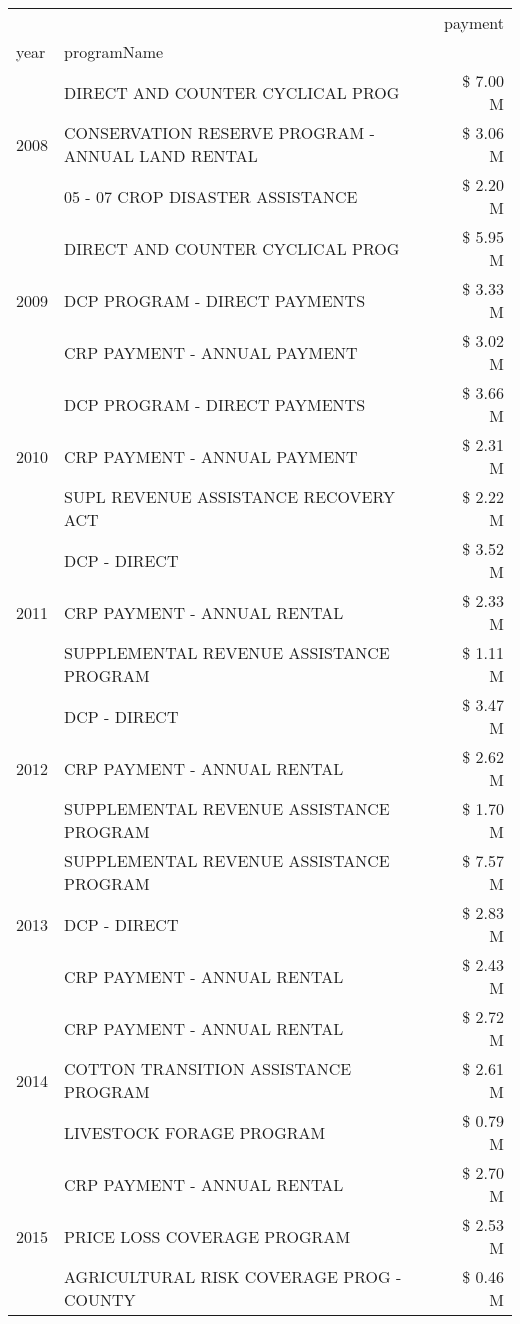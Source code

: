 \begin{tabular}{llr}
\toprule
 &  & payment \\
year & programName &  \\
\midrule
\multirow[t]{3}{*}{2008} & DIRECT AND COUNTER CYCLICAL PROG & \$ 7.00 M \\
 & CONSERVATION RESERVE PROGRAM - ANNUAL LAND RENTAL & \$ 3.06 M \\
 & 05 - 07 CROP DISASTER ASSISTANCE & \$ 2.20 M \\
\cline{1-3}
\multirow[t]{3}{*}{2009} & DIRECT AND COUNTER CYCLICAL PROG & \$ 5.95 M \\
 & DCP PROGRAM - DIRECT PAYMENTS & \$ 3.33 M \\
 & CRP PAYMENT - ANNUAL PAYMENT & \$ 3.02 M \\
\cline{1-3}
\multirow[t]{3}{*}{2010} & DCP PROGRAM - DIRECT PAYMENTS & \$ 3.66 M \\
 & CRP PAYMENT - ANNUAL PAYMENT & \$ 2.31 M \\
 & SUPL REVENUE ASSISTANCE RECOVERY ACT & \$ 2.22 M \\
\cline{1-3}
\multirow[t]{3}{*}{2011} & DCP - DIRECT & \$ 3.52 M \\
 & CRP PAYMENT - ANNUAL RENTAL & \$ 2.33 M \\
 & SUPPLEMENTAL REVENUE ASSISTANCE PROGRAM & \$ 1.11 M \\
\cline{1-3}
\multirow[t]{3}{*}{2012} & DCP - DIRECT & \$ 3.47 M \\
 & CRP PAYMENT - ANNUAL RENTAL & \$ 2.62 M \\
 & SUPPLEMENTAL REVENUE ASSISTANCE PROGRAM & \$ 1.70 M \\
\cline{1-3}
\multirow[t]{3}{*}{2013} & SUPPLEMENTAL REVENUE ASSISTANCE PROGRAM & \$ 7.57 M \\
 & DCP - DIRECT & \$ 2.83 M \\
 & CRP PAYMENT - ANNUAL RENTAL & \$ 2.43 M \\
\cline{1-3}
\multirow[t]{3}{*}{2014} & CRP PAYMENT - ANNUAL RENTAL & \$ 2.72 M \\
 & COTTON TRANSITION ASSISTANCE PROGRAM & \$ 2.61 M \\
 & LIVESTOCK FORAGE PROGRAM & \$ 0.79 M \\
\cline{1-3}
\multirow[t]{3}{*}{2015} & CRP PAYMENT - ANNUAL RENTAL & \$ 2.70 M \\
 & PRICE LOSS COVERAGE PROGRAM & \$ 2.53 M \\
 & AGRICULTURAL RISK COVERAGE PROG - COUNTY & \$ 0.46 M \\

\end{tabular}
